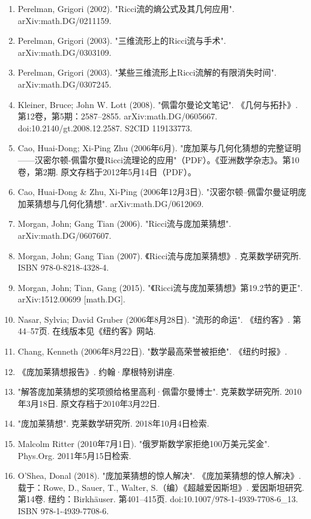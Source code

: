 \begin{enumerate}
\item Perelman, Grigori (2002). "Ricci流的熵公式及其几何应用". arXiv:math.DG/0211159.  
\item Perelman, Grigori (2003). "三维流形上的Ricci流与手术". arXiv:math.DG/0303109.  
\item Perelman, Grigori (2003). "某些三维流形上Ricci流解的有限消失时间". arXiv:math.DG/0307245.  
\item Kleiner, Bruce; John W. Lott (2008). "佩雷尔曼论文笔记". 《几何与拓扑》. 第12卷，第5期：2587–2855. arXiv:math.DG/0605667. doi:10.2140/gt.2008.12.2587. S2CID 119133773.  
\item Cao, Huai-Dong; Xi-Ping Zhu (2006年6月). "庞加莱与几何化猜想的完整证明——汉密尔顿-佩雷尔曼Ricci流理论的应用"（PDF）。《亚洲数学杂志》。第10卷，第2期. 原文存档于2012年5月14日（PDF）。  
\item Cao, Huai-Dong & Zhu, Xi-Ping (2006年12月3日). "汉密尔顿–佩雷尔曼证明庞加莱猜想与几何化猜想". arXiv:math.DG/0612069.  
\item Morgan, John; Gang Tian (2006). "Ricci流与庞加莱猜想". arXiv:math.DG/0607607.

\item Morgan, John; Gang Tian (2007). 《Ricci流与庞加莱猜想》. 克莱数学研究所. ISBN 978-0-8218-4328-4.  
\item Morgan, John; Tian, Gang (2015). "《Ricci流与庞加莱猜想》第19.2节的更正". arXiv:1512.00699 [math.DG].  
\item Nasar, Sylvia; David Gruber (2006年8月28日). "流形的命运". 《纽约客》. 第44–57页. 在线版本见《纽约客》网站.  
\item Chang, Kenneth (2006年8月22日). "数学最高荣誉被拒绝". 《纽约时报》.  
\item 《庞加莱猜想报告》. 约翰·摩根特别讲座.  
\item "解答庞加莱猜想的奖项颁给格里高利·佩雷尔曼博士". 克莱数学研究所. 2010年3月18日. 原文存档于2010年3月22日.  
\item "庞加莱猜想". 克莱数学研究所. 2018年10月4日检索.
\item Malcolm Ritter (2010年7月1日). "俄罗斯数学家拒绝100万美元奖金". Phys.Org. 2011年5月15日检索.  
\item O'Shea, Donal (2018). "庞加莱猜想的惊人解决". 《庞加莱猜想的惊人解决》. 载于：Rowe, D., Sauer, T., Walter, S.（编）《超越爱因斯坦》. 爱因斯坦研究. 第14卷. 纽约：Birkhäuser. 第401–415页. doi:10.1007/978-1-4939-7708-6_13. ISBN 978-1-4939-7708-6.
\end{enumerate}
